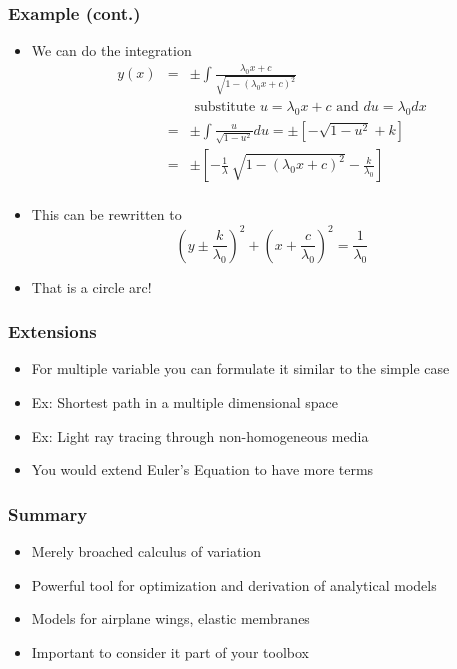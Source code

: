 \documentclass[10pt]{beamer}
\begin{document}
\begin{frame}
  \frametitle{Example (cont.)}
  \begin{itemize}
  \item We can do the integration
    \[
      \begin{array}{rcl}
        y(x) &=& \pm \int \frac{\lambda_0 x + c}{\sqrt{1 - (\lambda_0 x +c )^2}}\\
             && \mbox{ substitute } u = \lambda_0 x + c \mbox{ and } du = \lambda_0 dx \\
             &=& \pm \int \frac{u}{\sqrt{1-u^2}} du = \pm \left[ - \sqrt{1-u^2} + k \right] \\
             &=& \pm \left[ - \frac{ 1 }{ \lambda } ~  \sqrt{ 1 - ( \lambda_0 x + c )^2}   - \frac{k}{\lambda_0} \right]\\
      \end{array}
    \]
  \item This can be rewritten to
    \[
      \left( y \pm \frac{k}{\lambda_0} \right)^2  +
      \left( x + \frac{c}{\lambda_0} \right)^2 =
      \frac{1}{\lambda_0}
    \]
  \item That is a circle arc!
  \end{itemize}
\end{frame}

\begin{frame}
  \frametitle{Extensions}
  \begin{itemize}
  \item For multiple variable you can formulate it similar to the simple case
  \item Ex: Shortest path in a multiple dimensional space
  \item Ex: Light ray tracing through non-homogeneous media
  \item You would extend Euler's Equation to have more terms
  \end{itemize}
\end{frame}

\begin{frame}
  \frametitle{Summary}
  \begin{itemize}
  \item Merely broached calculus of variation
  \item Powerful tool for optimization and derivation of analytical models
  \item Models for airplane wings, elastic membranes
  \item Important to consider it part of your toolbox
  \end{itemize}
\end{frame}
\end{document}
